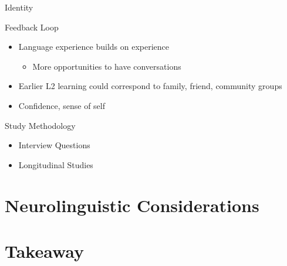 \documentclass{beamer}
\begin{document}
\begin{frame}{Identity}
  
\end{frame}

\begin{frame}{Feedback Loop}
  \begin{itemize}
    \item Language experience builds on experience
    \begin{itemize}
      \item More opportunities to have conversations
    \end{itemize}
    \item Earlier L2 learning could correspond to family, friend, community groups
    \item Confidence, sense of self
  \end{itemize}
\end{frame}

\begin{frame}{Study Methodology}
    \begin{itemize}
        \item Interview Questions
        \item Longitudinal Studies
    \end{itemize}
\end{frame}

\section{Neurolinguistic Considerations}

\section{Takeaway}
\end{document}
